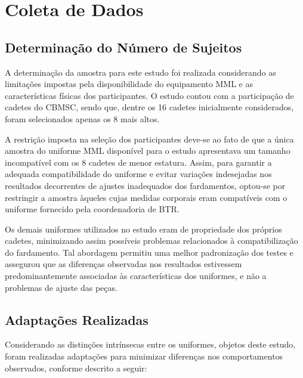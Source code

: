 \chapter{Coleta de Dados}
\section{Determinação do Número de Sujeitos}

A determinação da amostra para este estudo foi realizada considerando as limitações impostas pela 
disponibilidade do equipamento \acrshort{MML} e as características físicas dos participantes. 
O estudo contou com a participação de cadetes do \acrlong{CBMSC}, sendo que, dentre os 16 
cadetes inicialmente considerados, foram selecionados apenas os 8 mais altos.

\tab A restrição imposta na seleção dos participantes deve-se ao fato de que a única amostra 
do uniforme \acrlong{MML} disponível para o estudo apresentava um tamanho incompatível com os 8 
cadetes de menor estatura. Assim, para garantir a adequada compatibilidade do uniforme e evitar 
variações indesejadas nos resultados decorrentes de ajustes inadequados dos fardamentos, 
optou-se por restringir a amostra àqueles cujas medidas corporais eram compatíveis com o uniforme 
fornecido pela coordenadoria de \acrlong{BTR}.

\tab Os demais uniformes utilizados no estudo eram de propriedade dos próprios cadetes, minimizando assim possíveis problemas relacionados à compatibilização do fardamento. Tal abordagem permitiu uma melhor padronização dos testes e assegurou que as diferenças observadas nos resultados estivessem predominantemente associadas às características dos uniformes, e não a problemas de ajuste das peças.

\section{Adaptações Realizadas}

Considerando as distinções intrínsecas entre os uniformes, objetos deste estudo, foram realizadas adaptações para minimizar diferenças nos comportamentos observados, conforme descrito a seguir:

